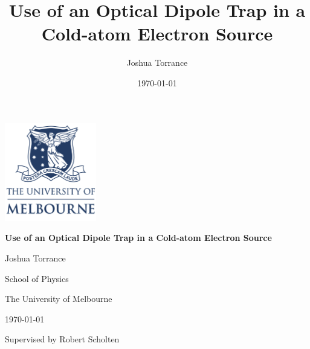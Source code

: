 \documentclass[12pt]{report}
\title{Use of an Optical Dipole Trap in a Cold-atom Electron Source}
\author{Joshua Torrance}
\date{\today}
\begin{document}

\renewcommand{\footnotesize}{\small}
\renewcommand{\footnoterule}{\relax}
\thispagestyle{empty}
\begin{center}
    {{{\includegraphics[width=4cm]{figs/unimelb.png}} \par}
 \Huge {\bfseries {Use of an Optical Dipole Trap in a Cold-atom Electron Source}} \par}
{\large \vspace*{35mm} \vspace*{15mm}}
    {{\vspace*{25mm} \Large {Joshua Torrance}} \par} 
{\large 
    \vspace*{1ex}
    {{School of Physics} \par}
    \vspace*{1ex}
    {{The University of Melbourne} \par}
    \vspace*{25mm}
    {\today\par}
    {Supervised by Robert Scholten\par}
}%
\end{center}
\null\vfill




\tableofcontents


\renewcommand{\chaptername}{} %



\glsresetall
%

\glsresetall

\glsresetall

\glsresetall


\twocolumn
\printglossaries
\onecolumn


\end{document}
